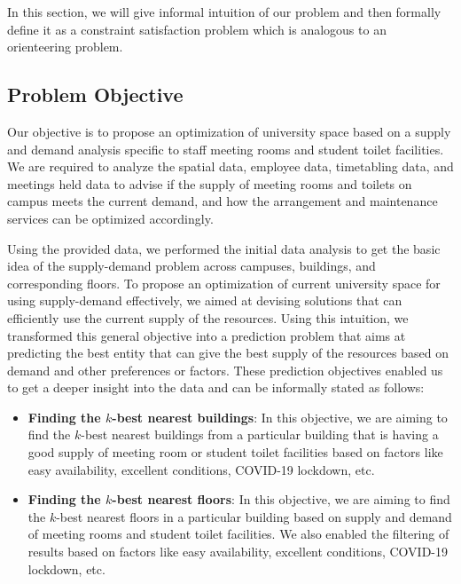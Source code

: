 In this section, we will give informal intuition of our problem and then formally define it as a constraint satisfaction problem which is analogous to an orienteering problem.

\subsection{Problem Objective}

Our objective is to propose an optimization of university space based on a supply and demand analysis specific to staff meeting rooms and student toilet facilities. We are required to analyze the spatial data, employee data, timetabling data, and meetings held data to advise if the supply of meeting rooms and toilets on campus meets the current demand, and how the arrangement and maintenance services can be optimized accordingly.

Using the provided data, we performed the initial data analysis to get the basic idea of the supply-demand problem across campuses, buildings, and corresponding floors. To propose an optimization of current university space for using supply-demand effectively, we aimed at devising solutions that can efficiently use the current supply of the resources. Using this intuition, we transformed this general objective into a prediction problem that aims at predicting the best entity that can give the best supply of the resources based on demand and other preferences or factors. These prediction objectives enabled us to get a deeper insight into the data and can be informally stated as follows:

\begin{itemize}
    \item \textbf{Finding the $k$-best nearest buildings}: In this objective, we are aiming to find the $k$-best nearest buildings from a particular building that is having a good supply of meeting room or student toilet facilities based on factors like easy availability, excellent conditions, COVID-19 lockdown, etc.
    
    \item \textbf{Finding the $k$-best nearest floors}: In this objective, we are aiming to find the $k$-best nearest floors in a particular building based on supply and demand of meeting rooms and student toilet facilities. We also enabled the filtering of results based on factors like easy availability, excellent conditions, COVID-19 lockdown, etc.
\end{itemize}


